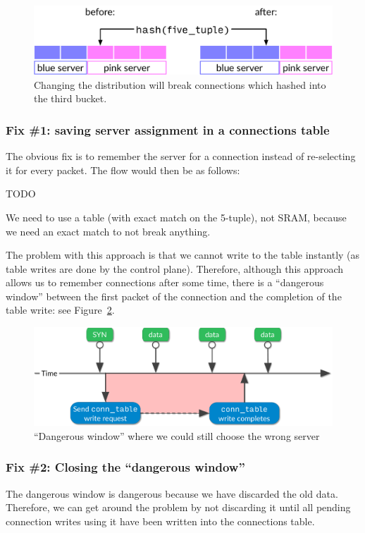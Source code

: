 \documentclass[11pt,oneside,a4paper]{article}
\begin{document}
\begin{figure}[h]
\centering
\includegraphics[width=.5\textwidth]{figures/hash-problem.pdf}
\caption{Changing the distribution will break connections which hashed into the
    third bucket.}
\label{fig:hash-problem}
\end{figure}

\subsubsection{Fix \#1: saving server assignment in a connections table}

The obvious fix is to remember the server for a connection instead of
re-selecting it for every packet.
The flow would then be as follows:

TODO

We need to use a table (with exact match on the 5-tuple), not SRAM, because we
need an exact match to not break anything.

The problem with this approach is that we cannot write to the table instantly
(as table writes are done by the control plane).
Therefore, although this approach allows us to remember connections after some
time, there is a ``dangerous window'' between the first packet of the connection
and the completion of the table write: see Figure~\ref{fig:timeline}.

\begin{figure}[h]
\centering
\includegraphics[width=.5\textwidth]{figures/timeline.pdf}
\caption{``Dangerous window'' where we could still choose the wrong
    server}
\label{fig:timeline}
\end{figure}

\subsubsection{Fix \#2: Closing the ``dangerous window''}
The dangerous window is dangerous because we have discarded the old data.
Therefore, we can get around the problem by not discarding it until all pending
connection writes using it have been written into the connections table.
\end{document}
